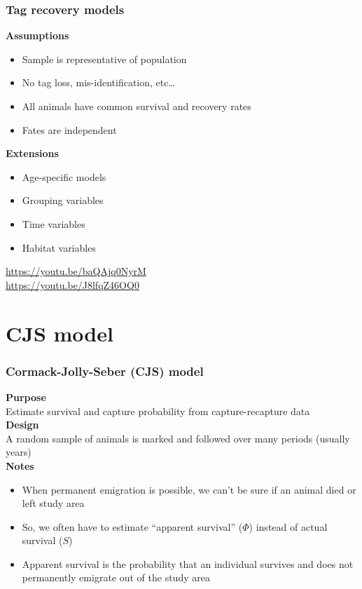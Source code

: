 \documentclass[color=usenames,dvipsnames]{beamer}\usepackage[]{graphicx}\usepackage[]{xcolor}
\begin{document}
\begin{frame}
  \frametitle{Tag recovery models}
  \large
  {\bf Assumptions}
  \begin{itemize}
    \item Sample is representative of population
    \item No tag loss, mis-identification, etc\dots
    \item All animals have common survival and recovery rates
    \item Fates are independent
  \end{itemize}
  \pause
  \vfill
  {\bf Extensions}
  \begin{itemize}
    \item Age-specific models
    \item Grouping variables
    \item Time variables
    \item Habitat variables
  \end{itemize}
  \vfill
  \centering
  \color{blue}
  \url{
    https://youtu.be/baQAjq0NyrM
  } \\
  \url{
    https://youtu.be/J8lfqZ46OQ0 
  } \\
\end{frame}




\section{CJS model}

\begin{frame}
  \frametitle{Cormack-Jolly-Seber (CJS) model}
  {\bf Purpose} \\
  Estimate survival and capture probability from capture-recapture data \\
  \pause
  \vspace{0.5cm}
  {\bf Design} \\
  A random sample of animals is marked and followed over many periods
  (usually years) \\
  \pause
  \vspace{0.5cm}
  {\bf Notes} \\
  \begin{itemize}[<+->]
    \item When permanent emigration is possible, we can't be sure if
    an animal died or left study area
    \item So, we often have to estimate ``apparent survival'' ($\Phi$)
      instead of actual survival ($S$)
    \item Apparent survival is the probability that an individual
      survives and does not permanently emigrate out of the study area
  \end{itemize}
\end{frame}
\end{document}
